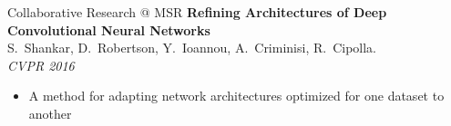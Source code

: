 \documentclass[t,xcolor=dvipsnames]{beamer}
\begin{document}

\begin{frame}{Collaborative Research @ MSR}
\textbf{Refining Architectures of Deep Convolutional Neural Networks}\\{\footnotesize S.\ Shankar, D.\ Robertson, Y.\ Ioannou, A.\ Criminisi, R.\ Cipolla.\\\textit{CVPR 2016}}
\begin{itemize}
    \item A method for adapting network architectures optimized for one dataset to another
\end{itemize}
\end{frame}
\end{document}
